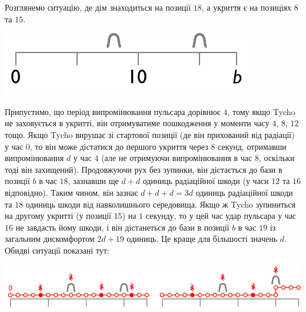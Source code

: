 Розглянемо ситуацію, де дім знаходиться на позиції $18$, а укриття є на позиціях $8$ та $15$.

\includegraphics[width=.3\textwidth]{img/samplesetup}

Припустимо, що період випромінювання пульсара дорівнює $4$, тому якщо Tycho не заховується в укритті, він отримуватиме пошкодження у моменти часу $4$, $8$, $12$ тощо.
Якщо Tycho вирушає зі стартової позиції (де він прихований від радіації) у час $0$, то він може дістатися до першого укриття через $8$ секунд, отримавши випромінювання $d$ у час $4$ (але не отримуючи випромінювання в час $8$, оскільки тоді він захищений).
Продовжуючи рух без зупинки, він дістається до бази в позиції $b$ в час $18$, зазнавши ще $d+d$ одиниць радіаційної шкоди (у часи $12$ та $16$ відповідно).
Таким чином, він зазнає $d+d+d=3d$ одиниць радіаційної шкоди та $18$ одиниць шкоди від навколишнього середовища.
Якщо ж Tycho зупиниться на другому укритті (у позиції $15$) на $1$ секунду, то у цей час удар пульсара у час $16$ не завдасть йому шкоди, і він дістанеться до бази в позиції $b$ в час $19$ із загальним дискомфортом $2d + 19$ одиниць.
Це краще для більшості значень $d$.
Обидві ситуації показані тут:

\includegraphics[width=.8\textwidth]{img/sample1_2.pdf}

